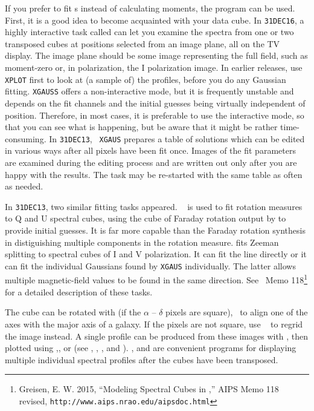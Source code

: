     If you prefer to fit s instead of calculating
moments, the program {\tt {}} can be used. First, it is a
good idea to become acquainted with your data cube.  In {\tt 31DEC16},
a highly interactive task called {\tt {}} can let you
examine the spectra from one or two transposed cubes at positions
selected from an image plane, all on the TV display.  The image plane
should be some image representing the full field, such as moment-zero
or, in polarization, the I polarization image.  In earlier releases,
use {\tt XPLOT} first to look at (a sample of) the profiles, before
you do any Gaussian fitting.  {\tt XGAUSS} offers a non-interactive
mode, but it is frequently unstable and depends on the fit channels
and the initial guesses being virtually independent of position.
Therefore, in most cases, it is preferable to use the interactive
mode, so that you can see what is happening, but be aware that it
might be rather time-consuming.  In {\tt 31DEC13}, {\tt
XGAUS} prepares a table of solutions which can be edited in various
ways after all pixels have been fit once.  Images of the fit
parameters are examined during the editing process and are written out
only after you are happy with the results.  The task may be re-started
with the same table as often as needed.

     In {\tt 31DEC13}, two similar fitting tasks appeared.  {\tt
{}} is used to fit rotation measures to Q and U spectral
cubes, using the cube of Faraday rotation output by {\tt {}}
to provide initial guesses.  It is far more capable than the Faraday
rotation synthesis in distiguishing multiple components in the
rotation measure.  {\tt {}} fits Zeeman splitting to
spectral cubes of I and V polarization.  It can fit the line directly
or it can fit the individual Gaussians found by {\tt XGAUS}
individually.  The latter allows multiple magnetic-field values to be
found in the same direction.  See \AIPS\ Memo 118\footnote{Greisen, E.
W. 2015, ``Modeling Spectral Cubes in \AIPS,'' AIPS Memo 118 revised,
{\tt http://www.aips.nrao.edu/aipsdoc.html}} for a detailed
description of these tasks.

     The cube can be rotated with {\tt {}} (if the $\alpha$
-- $\delta$ pixels are square), \eg\ to align one of the axes with the
major axis of a galaxy.  If the pixels are not square, use {\tt
{}} to regrid the image instead.  A single profile can be
produced from these images with {\tt {}}, then plotted using
{\tt {}},{\tt {}}, or {\tt {}} (see
, , , and ).
{\tt {}}, {\tt {}} and {\tt {}} are
convenient programs for displaying multiple individual spectral
profiles after the cubes have been transposed.

